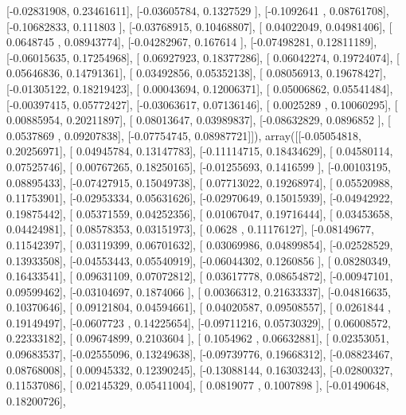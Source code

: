 \documentclass{article}
\begin{document}
       [-0.02831908,  0.23461611],
       [-0.03605784,  0.1327529 ],
       [-0.1092641 ,  0.08761708],
       [-0.10682833,  0.111803  ],
       [-0.03768915,  0.10468807],
       [ 0.04022049,  0.04981406],
       [ 0.0648745 ,  0.08943774],
       [-0.04282967,  0.167614  ],
       [-0.07498281,  0.12811189],
       [-0.06015635,  0.17254968],
       [ 0.06927923,  0.18377286],
       [ 0.06042274,  0.19724074],
       [ 0.05646836,  0.14791361],
       [ 0.03492856,  0.05352138],
       [ 0.08056913,  0.19678427],
       [-0.01305122,  0.18219423],
       [ 0.00043694,  0.12006371],
       [ 0.05006862,  0.05541484],
       [-0.00397415,  0.05772427],
       [-0.03063617,  0.07136146],
       [ 0.0025289 ,  0.10060295],
       [ 0.00885954,  0.20211897],
       [ 0.08013647,  0.03989837],
       [-0.08632829,  0.0896852 ],
       [ 0.0537869 ,  0.09207838],
       [-0.07754745,  0.08987721]]), array([[-0.05054818,  0.20256971],
       [ 0.04945784,  0.13147783],
       [-0.11114715,  0.18434629],
       [ 0.04580114,  0.07525746],
       [ 0.00767265,  0.18250165],
       [-0.01255693,  0.1416599 ],
       [-0.00103195,  0.08895433],
       [-0.07427915,  0.15049738],
       [ 0.07713022,  0.19268974],
       [ 0.05520988,  0.11753901],
       [-0.02953334,  0.05631626],
       [-0.02970649,  0.15015939],
       [-0.04942922,  0.19875442],
       [ 0.05371559,  0.04252356],
       [ 0.01067047,  0.19716444],
       [ 0.03453658,  0.04424981],
       [ 0.08578353,  0.03151973],
       [ 0.0628    ,  0.11176127],
       [-0.08149677,  0.11542397],
       [ 0.03119399,  0.06701632],
       [ 0.03069986,  0.04899854],
       [-0.02528529,  0.13933508],
       [-0.04553443,  0.05540919],
       [-0.06044302,  0.1260856 ],
       [ 0.08280349,  0.16433541],
       [ 0.09631109,  0.07072812],
       [ 0.03617778,  0.08654872],
       [-0.00947101,  0.09599462],
       [-0.03104697,  0.1874066 ],
       [ 0.00366312,  0.21633337],
       [-0.04816635,  0.10370646],
       [ 0.09121804,  0.04594661],
       [ 0.04020587,  0.09508557],
       [ 0.0261844 ,  0.19149497],
       [-0.0607723 ,  0.14225654],
       [-0.09711216,  0.05730329],
       [ 0.06008572,  0.22333182],
       [ 0.09674899,  0.2103604 ],
       [ 0.1054962 ,  0.06632881],
       [ 0.02353051,  0.09683537],
       [-0.02555096,  0.13249638],
       [-0.09739776,  0.19668312],
       [-0.08823467,  0.08768008],
       [ 0.00945332,  0.12390245],
       [-0.13088144,  0.16303243],
       [-0.02800327,  0.11537086],
       [ 0.02145329,  0.05411004],
       [ 0.0819077 ,  0.1007898 ],
       [-0.01490648,  0.18200726],
\end{document}
